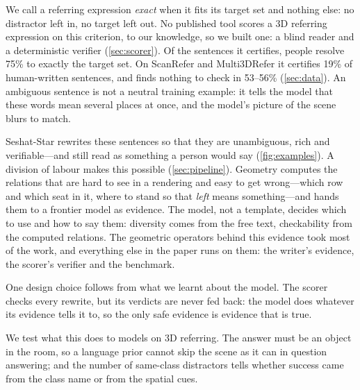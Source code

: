 We call a referring expression \emph{exact} when it fits its target set and nothing else: no distractor left in, no target left out. No published tool scores a 3D referring expression on this criterion, to our knowledge, so we built one: a blind reader and a deterministic verifier (\cref{sec:scorer}). Of the sentences it certifies, people resolve 75\% to exactly the target set. On ScanRefer and Multi3DRefer it certifies 19\% of human-written sentences, and finds nothing to check in 53--56\% (\cref{sec:data}). An ambiguous sentence is not a neutral training example: it tells the model that these words mean several places at once, and the model's picture of the scene blurs to match.

Seshat-Star rewrites these sentences so that they are unambiguous, rich and verifiable---and still read as something a person would say (\cref{fig:examples}). A division of labour makes this possible (\cref{sec:pipeline}). Geometry computes the relations that are hard to see in a rendering and easy to get wrong---which row and which seat in it, where to stand so that \emph{left} means something---and hands them to a frontier model as evidence. The model, not a template, decides which to use and how to say them: diversity comes from the free text, checkability from the computed relations. The geometric operators behind this evidence took most of the work, and everything else in the paper runs on them: the writer's evidence, the scorer's verifier and the benchmark.

One design choice follows from what we learnt about the model. The scorer checks every rewrite, but its verdicts are never fed back: the model does whatever its evidence tells it to, so the only safe evidence is evidence that is true.

We test what this does to models on 3D referring. The answer must be an object in the room, so a language prior cannot skip the scene as it can in question answering; and the number of same-class distractors tells whether success came from the class name or from the spatial cues.

